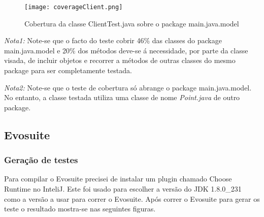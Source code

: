 \begin{figure}[H]

  \centering

  \texttt{[image: coverageClient.png]}

  \caption {Cobertura da classe ClientTest.java sobre o package main.java.model}

  \label {fig31}

\end{figure}

\par \textit{Nota1:} Note-se que o facto do teste cobrir 46\% das classes do package main.java.model e 20\% dos métodos deve-se á necessidade, por parte da classe visada, de incluir objetos e recorrer a métodos de outras classes do mesmo package para ser completamente testada.\newline
\par \textit{Nota2:} Note-se que o teste de cobertura só abrange o package main.java.model. No entanto, a classe testada utiliza uma classe de nome \textit{Point.java} de outro package.

\subsection{Evosuite}

\subsubsection{Geração de testes}

\par Para compilar o Evosuite precisei de instalar um plugin chamado Choose Runtime no InteliJ. Este foi usado para escolher a versão do JDK 1.8.0\_231 como a versão a usar para correr o Evosuite. Após correr o Evosuite para gerar os teste o resultado mostra-se nas seguintes figuras.

